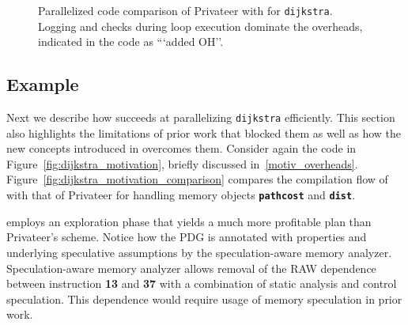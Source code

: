 \begin{figure}[!h]
\centering
\scriptsize
{}
\caption{Parallelized code comparison of Privateer with \name for
\texttt{dijkstra}. Logging and checks during loop execution dominate the
overheads, indicated in the code as ```added OH''.}
\label{fig:dijkstra_motivation_comparison_source_code}
\end{figure}


\subsection{Example}
\label{motiv_example}

Next we describe how \name succeeds at parallelizing
\texttt{dijkstra} efficiently. This section also highlights the limitations
of prior work that blocked them as well as how the new concepts introduced
in \name overcomes them.
%
Consider again the code in Figure~\ref{fig:dijkstra_motivation},
briefly discussed in~\ref{motiv_overheads}.
%
Figure~\ref{fig:dijkstra_motivation_comparison} compares the
compilation flow of \name with that of Privateer for handling memory objects
\texttt{\textbf{pathcost}} and \texttt{\textbf{dist}}.

\name employs an exploration phase that yields a much more profitable plan
than Privateer's scheme.
Notice how the PDG is annotated with properties and underlying speculative
assumptions by the speculation-aware memory analyzer. Speculation-aware
memory analyzer allows removal of the RAW dependence between instruction
\textbf{13}
and \textbf{37} with a combination of static analysis and control speculation. This
dependence would require usage of memory speculation in prior work.
%

